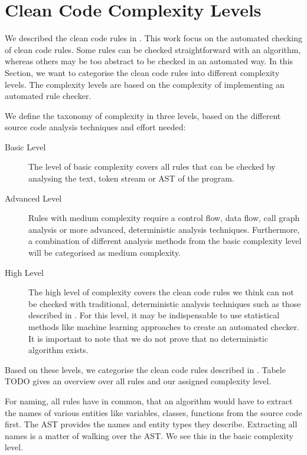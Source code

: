 \section{Clean Code Complexity Levels}\label{sec:cc_complexity_levels}
We described the clean code rules in . This work focus on the automated checking of clean code rules. Some rules can be checked straightforward with an algorithm, whereas others may be too abstract to be checked in an automated way. In this Section, we want to categorise the clean code rules into different complexity levels. The complexity levels are based on the complexity of implementing an automated rule checker. 

We define the taxonomy of complexity in three levels, based on the different source code analysis techniques and effort needed:
\begin{description}
    \item[Basic Level] The level of basic complexity covers all rules that can be checked by analysing the text, token stream or AST of the program.
    \item[Advanced Level] Rules with medium complexity require a control flow, data flow, call graph analysis or more advanced, deterministic analysis techniques. Furthermore, a combination of different analysis methods from the basic complexity level will be categorised as medium complexity. 
    \item[High Level] The high level of complexity covers the clean code rules we think can not be checked with traditional, deterministic analysis techniques such as those described in . For this level, it may be indispensable to use statistical methods like machine learning approaches to create an automated checker. It is important to note that we do not prove that no deterministic algorithm exists. 
\end{description}

Based on these levels, we categorise the clean code rules described in . Tabele TODO gives an overview over all rules and our assigned complexity level.

For naming, all rules have in common, that an algorithm would have to extract the names of various entities like variables, classes, functions from the source code first. The AST provides the names and entity types they describe. Extracting all names is a matter of walking over the AST. We see this in the basic complexity level.

